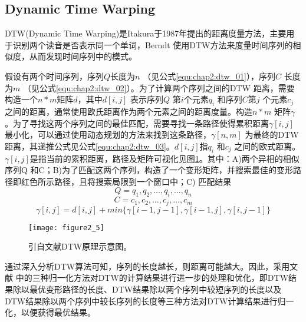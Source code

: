 \subsection{Dynamic Time Warping}
DTW(Dynamic Time Warping)是Itakura于1987年提出的距离度量方法，主要用于识别两个读音是否表示同一个单词，Berndt 使用DTW方法来度量时间序列的相似度，从而发现时间序列中的模式。
\par 假设有两个时间序列，序列$Q$长度为$n$ （见公式\ref{equ:chap2:dtw_01}），序列$C$ 长度为$m$ （见公式\ref{equ:chap2:dtw_02}）。为了计算两个序列之间的DTW 距离，需要构造一个$n \ast m$矩阵$d$，其中$d[i,j]$ 表示序列$Q$ 第$i$个元素$q_{i}$ 和序列$C$第$j$ 个元素$c_{j}$之间的距离，通常使用欧氏距离作为两个元素之间的距离度量。构造$n \ast m$ 矩阵$\gamma$。为了寻找这两个序列之间的最佳匹配，需要寻找一条路径使得累积距离$\gamma[i,j]$最小化，可以通过使用动态规划的方法来找到这条路径，$\gamma[n,m]$ 为最终的DTW距离，其递推公式见公式\ref{equ:chap2:dtw_03}。$d[i,j]$指$q_{i}$ 和$c_{j}$ 之间的欧式距离。$\gamma[i,j]$是指当前的累积距离，路径及矩阵可视化见图\ref{fig:2_5}。其中：A)两个异相的相似序列Q 和C；B)为了匹配这两个序列，构造了一个变形矩阵，并搜索最佳的变形路径即红色所示路径，且将搜索局限到一个窗口中；C) 匹配结果
\begin{equation}
\label{equ:chap2:dtw_01}
Q=q_{1},q_{2},…,q_{i},…,q_{n}
\end{equation}
\begin{equation}
\label{equ:chap2:dtw_02}
C=c_{1},c_{2},…,c_{j},…,c_{m}
\end{equation}
\begin{equation}
\label{equ:chap2:dtw_03}
\gamma[i,j]=d[i,j]+min\{\gamma[i-1,j-1],\gamma[i-1,j],\gamma[i,j-1]\}
\end{equation}
\begin{figure}[htp]
\centering
\texttt{[image: figure2\_5]}
\caption{引自文献\cite{ratanamahatana2004everything}DTW原理示意图。}
\label{fig:2_5}
\end{figure}
\par 通过深入分析DTW算法可知，序列的长度越长，则距离可能越大。因此，采用文献\cite{ratanamahatana2004everything} 中的三种归一化方法对DTW的计算结果进行进一步的处理和优化，即DTW结果除以最优变形路径的长度、DTW结果除以两个序列中较短序列的长度以及DTW结果除以两个序列中较长序列的长度等三种方法对DTW计算结果进行归一化，以便获得最优结果。
